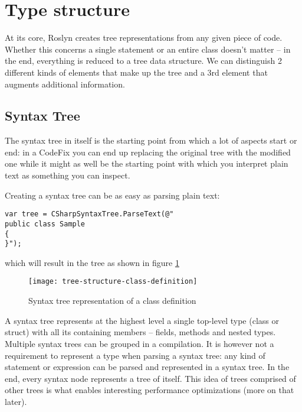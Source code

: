 \section{Type structure}
\label{sec:type-structure}

At its core, Roslyn creates tree representations from any given piece of code. Whether this concerns a single statement or an entire class doesn't matter -- in the end, everything is reduced to a tree data structure. We can distinguish 2 different kinds of elements that make up the tree and a 3rd element that augments additional information.

\subsection{Syntax Tree}
\label{sec:syntax-tree}

The syntax tree in itself is the starting point from which a lot of aspects start or end: in a CodeFix you can end up replacing the original tree with the modified one while it might as well be the starting point with which you interpret plain text as something you can inspect.

Creating a syntax tree can be as easy as parsing plain text:

\begin{lstlisting}
var tree = CSharpSyntaxTree.ParseText(@"
public class Sample
{
}");
\end{lstlisting}

which will result in the tree as shown in figure \ref{fig:tree-structure-class-definition}

\begin{figure}[h]
\centering
\texttt{[image: tree-structure-class-definition]}
\caption{Syntax tree representation of a class definition}
\label{fig:tree-structure-class-definition}
\end{figure}

A syntax tree represents at the highest level a single top-level type (class or struct) with all its containing members -- fields, methods and nested types. Multiple syntax trees can be grouped in a compilation. It is however not a requirement to represent a type when parsing a syntax tree: any kind of statement or expression can be parsed and represented in a syntax tree. In the end, every syntax node represents a tree of itself. This idea of trees comprised of other trees is what enables interesting performance optimizations (more on that later). 


